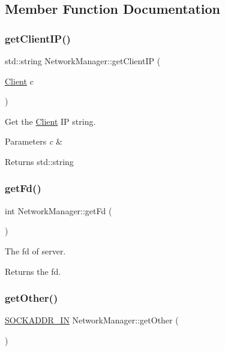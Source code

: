 \subsection{Member Function Documentation}
\mbox{\label{classNetworkManager_aeec2cdb10fa286ccf9170ce3a2192202}} 
\subsubsection{\texorpdfstring{getClientIP()}{getClientIP()}}
{\footnotesize\ttfamily std\+::string Network\+Manager\+::get\+Client\+IP (\begin{DoxyParamCaption}\item[{\mbox{\hyperlink{classClient}{Client}}}]{c }\end{DoxyParamCaption})}



Get the \mbox{\hyperlink{classClient}{Client}} IP string. 


\begin{DoxyParams}{Parameters}
{\em c} & \\
\hline
\end{DoxyParams}
\begin{DoxyReturn}{Returns}
std\+::string 
\end{DoxyReturn}
\mbox{\label{classNetworkManager_ae437a06c3cfa8c7c2df9f7e98f0395bf}} 
\subsubsection{\texorpdfstring{getFd()}{getFd()}}
{\footnotesize\ttfamily int Network\+Manager\+::get\+Fd (\begin{DoxyParamCaption}{ }\end{DoxyParamCaption})}

The fd of server. \begin{DoxyReturn}{Returns}
the fd. 
\end{DoxyReturn}
\mbox{\label{classNetworkManager_add2dcea7f26b8ff8ac6a5c49d4c956eb}} 
\subsubsection{\texorpdfstring{getOther()}{getOther()}}
{\footnotesize\ttfamily \mbox{\hyperlink{NetworkManager_8hpp_a6a34800fb5689e853f978b485a41aa39}{S\+O\+C\+K\+A\+D\+D\+R\+\_\+\+IN}} Network\+Manager\+::get\+Other (\begin{DoxyParamCaption}{ }\end{DoxyParamCaption})}

